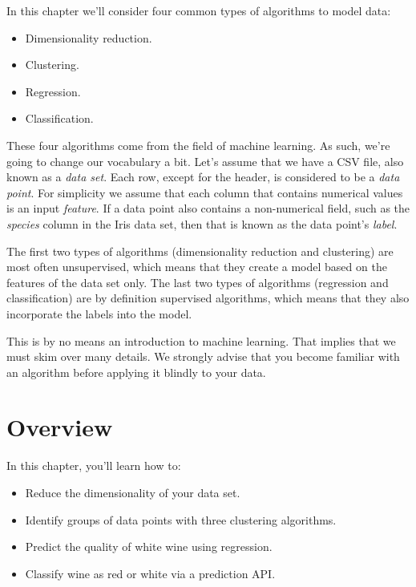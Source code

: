 \documentclass[
]{book}
\providecommand{\tightlist}{%
  \setlength{\itemsep}{0pt}\setlength{\parskip}{0pt}}
\theoremstyle{definition}
\theoremstyle{definition}
\theoremstyle{definition}
\theoremstyle{remark}
\begin{document}
In this chapter we'll consider four common types of algorithms to model data:

\begin{itemize}
\tightlist
\item
  Dimensionality reduction.
\item
  Clustering.
\item
  Regression.
\item
  Classification.
\end{itemize}

These four algorithms come from the field of machine learning. As such, we're going to change our vocabulary a bit. Let's assume that we have a CSV file, also known as a \emph{data set}. Each row, except for the header, is considered to be a \emph{data point}. For simplicity we assume that each column that contains numerical values is an input \emph{feature}. If a data point also contains a non-numerical field, such as the \emph{species} column in the Iris data set, then that is known as the data point's \emph{label}.

The first two types of algorithms (dimensionality reduction and clustering) are most often unsupervised, which means that they create a model based on the features of the data set only. The last two types of algorithms (regression and classification) are by definition supervised algorithms, which means that they also incorporate the labels into the model.

\begin{rmdcaution}
This is by no means an introduction to machine learning. That implies that we must skim over many details. We strongly advise that you become familiar with an algorithm before applying it blindly to your data.
\end{rmdcaution}

\hypertarget{overview}{%
\section{Overview}\label{overview}}

In this chapter, you'll learn how to:

\begin{itemize}
\tightlist
\item
  Reduce the dimensionality of your data set.
\item
  Identify groups of data points with three clustering algorithms.
\item
  Predict the quality of white wine using regression.
\item
  Classify wine as red or white via a prediction API.
\end{itemize}
\end{document}

